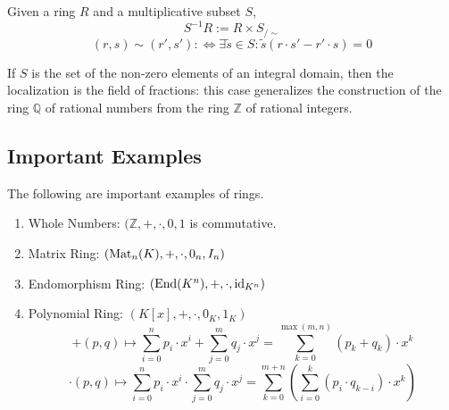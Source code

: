 \begin{definition}[Localization]
   Given a ring \(R\) and a multiplicative subset \(S\),
   \[S^{-1}R := R \times S_{/\sim}\]
   \[(r, s) \sim (r', s') :\iff \exists \tilde{s} \in S: \tilde{s}(r\cdot s' - r'\cdot s) = 0\]
\end{definition}
\begin{example}
   If \(S\) is the set of the non-zero elements of an integral domain, then the localization is the field of fractions: this case generalizes the construction of the ring \(\mathbb{Q}\) of rational numbers from the ring \(\mathbb{Z}\) of rational integers.
\end{example}

\subsection{Important Examples}
\begin{proposition}
   The following are important examples of rings.
   \begin{enumerate}[label=\roman*, align=Center]
      \item Whole Numbers: \((\mathbb{Z}, +, \cdot, 0, 1\) is commutative.
      \item Matrix Ring: \((\operatorname{Mat}_n(K), +, \cdot, 0_n, I_n)\)
      \item Endomorphism Ring: \((\operatorname{End}(K^n), +, \cdot, \operatorname{id}_{K^n})\)
      \item Polynomial Ring: \((K[x], +, \cdot, 0_K, 1_K)\)
         \[+(p, q) \mapsto \sum_{i=0}^n p_i \cdot x^i + \sum_{j=0}^m q_j \cdot x^j = \sum_{k=0}^{\max(m,n)} (p_k + q_k) \cdot x^k\]
         \[\cdot(p, q) \mapsto \sum_{i=0}^n p_i \cdot x^i \cdot \sum_{j=0}^m q_j \cdot x^j = \sum_{k=0}^{m+n} \left(\sum_{i=0}^k (p_i \cdot q_{k-i}) \cdot x^k\right)\]
   \end{enumerate}
\end{proposition}
